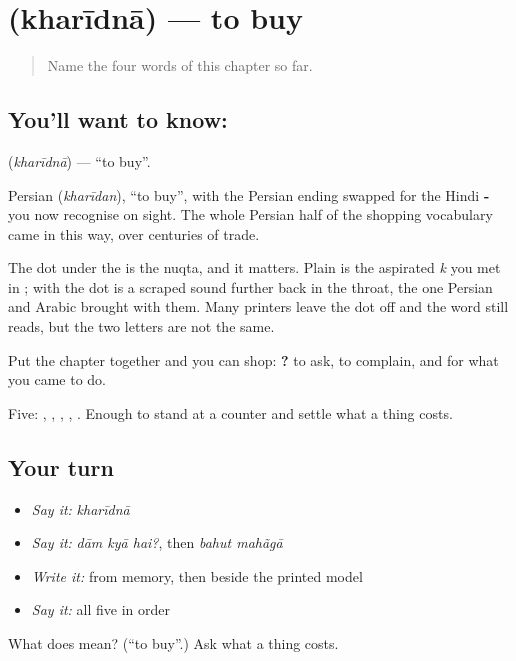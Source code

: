\section[kharīdnā]{ (kharīdnā) — to buy}

\label{lesson:HI-C72-buy}



\begin{quote}
Name the four words of this chapter so far.
\end{quote}

\subsection*{You'll want to know: }
\textbf{} (\emph{kharīdnā}) — \textquotedblleft{}to buy\textquotedblright{}.

Persian  (\emph{kharīdan}), \textquotedblleft{}to buy\textquotedblright{}, with the Persian ending swapped for the Hindi \textbf{-} you now recognise on sight. The whole Persian half of the shopping vocabulary came in this way, over centuries of trade.

The dot under the  is the nuqta, and it matters. Plain \textbf{} is the aspirated \emph{k} you met in \textbf{}; \textbf{} with the dot is a scraped sound further back in the throat, the one Persian and Arabic brought with them. Many printers leave the dot off and the word still reads, but the two letters are not the same.

Put the chapter together and you can shop: \textbf{  ?} to ask, \textbf{ } to complain, and  for what you came to do.

\begin{grammarlens}[title={What you've built}]
Five: , , , , . Enough to stand at a counter and settle what a thing costs.
\end{grammarlens}

\subsection*{Your turn}
\begin{itemize}
\raggedright
  \item \emph{Say it:} \emph{kharīdnā}
  \item \emph{Say it:} \emph{dām kyā hai?}, then \emph{bahut mahãgā}
  \item \emph{Write it:}  from memory, then  beside the printed model
  \item \emph{Say it:} all five in order
\end{itemize}

\begin{tcolorbox}[breakable,colback=teal!4,colframe=teal!35!black,title={Before you move on}]
What does  mean? (\textquotedblleft{}to buy\textquotedblright{}.) Ask what a thing costs.
\end{tcolorbox}
